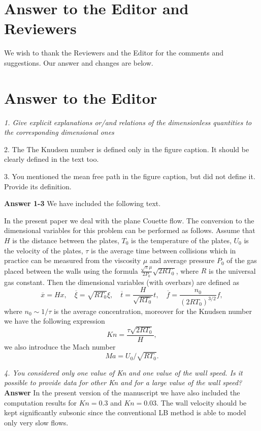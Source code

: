 \documentclass{article}
\begin{document}
\section*{Answer to the Editor and Reviewers}
We wish to thank the Reviewers and the Editor for the comments and suggestions. Our answer and  changes are below.

\section*{Answer  to the Editor}

{\it 1. Give explicit explanations or/and relations of the dimensionless quantities to  the corresponding dimensional ones

 2. The The Knudsen number is defined only in the figure caption. It should be clearly defined in the text too.

3.  You mentioned the mean free path in the figure caption, but did not define it. Provide its definition.
}

{\bf Answer 1-3} We have  included  the  following text.

In the  present  paper we deal with the plane Couette flow. The conversion to the dimensional variables for this  problem can be  performed  as follows. Assume that $H$ is the distance  between the plates, $T_0$ is the temperature  of the plates, $U_0$ is the  velocity of the plates,
$\tau$ is the  average time between collisions which in practice can be  measured from the viscosity $\mu$ and average pressure $P_0$ of the gas placed between the walls using the formula $\frac{\sqrt{\pi}\mu}{2 P_0}\sqrt{2RT_0}$, where $R$ is the universal gas  constant. Then the dimensional variables (with  overbars) are defined as
$$
\overline{x}=Hx, \quad \overline{\xi}=\sqrt{RT_0} \xi , \quad \overline{t}=\frac{H}{\sqrt{RT_0}}t , \quad \overline{f}=\frac{n_0}{(2RT_0)^{3/2}} f,
$$
where $n_0 \sim 1/\tau$ is the average concentration,
moreover for the Knudsen number we have  the following expression
$$
Kn=\frac{\tau\sqrt{2RT_0}}{H} ,
$$
we also introduce the Mach number
$$
Ma=U_0/\sqrt{RT_0}.
$$


{\it 
4. You considered only one value of Kn and one value of the wall speed. Is it possible to provide data for other Kn and for a large value of the  wall speed?
}
{\bf Answer}
In the present  version of the manuscript we have also included the computation
results for $Kn=0.3$ and $Kn=0.03$. The wall velocity should be kept  significantly subsonic since the conventional LB method is able to model only very slow flows.
\end{document}
